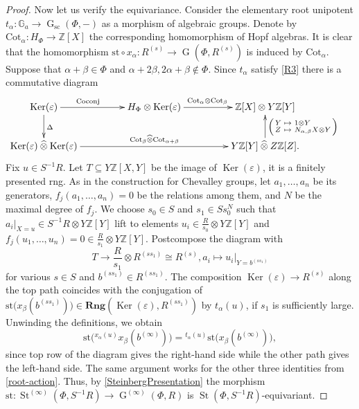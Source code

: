 \documentclass[oneside, 11pt]{amsart}
\numberwithin{equation}{section}
\theoremstyle{definition}
\theoremstyle{remark}
\DeclareMathOperator\St{St}
\DeclareMathOperator\Ker{Ker}
\DeclareMathOperator\GG{G}
\newcommand{\Rng}{\mathbf{Rng}}
\newcommand{\ZZ}{\mathbb{Z}}
\newcommand{\otimeshat}{\mathbin{\widehat{\otimes}}}
\newcommand{\up}[2]{{^{#1}\!{#2}}}
\begin{document}
\begin{proof}
 Now let us verify the equivariance. Consider the elementary root unipotent \(t_\alpha \colon \mathbb{G}_a \to \GG_{\mathrm{sc}}(\Phi, -)\) as a morphism of algebraic groups.
 Denote by \(\mathrm{Cot}_\alpha \colon H_\Phi \to \mathbb Z[X]\) the corresponding homomorphism of Hopf algebras. It is clear that the homomorphism \(\mathrm{st} \circ x_\alpha \colon R^{(s)} \to \GG(\Phi, R^{(s)})\) is induced by \(\mathrm{Cot}_\alpha\).
 Suppose that \(\alpha + \beta \in \Phi\) and \(\alpha + 2\beta, 2\alpha + \beta \notin \Phi\).
 Since $t_\alpha$ satisfy \eqref{R3} there is a commutative diagram
 \[\xymatrix@+1.8pc @R=2pc {
 \Ker(\varepsilon) \ar[r]^(.4){\mathrm{Coconj}} \ar[d]^{\Delta} &
 H_\Phi \otimes \Ker(\varepsilon) \ar[r]^(0.48){\mathrm{Cot}_\alpha \otimes \mathrm{Cot}_\beta} &
 \mathbb Z[X] \otimes Y \mathbb Z[Y]\\
 \Ker(\varepsilon) \otimeshat \Ker(\varepsilon) \ar[rr]^{\mathrm{Cot}_\beta \otimeshat \mathrm{Cot}_{\alpha + \beta}} &&
 Y \mathbb Z[Y] \otimeshat Z \mathbb Z[Z]. \ar[u]_{\begin{psmallmatrix*}[l] Y & \mapsto & 1 \otimes Y\\ Z & \mapsto & N_{\alpha,\beta} X \otimes Y \end{psmallmatrix*}} &
 }\]
 Fix \(u \in S^{-1} R\). Let \(T \subseteq Y \ZZ[X, Y]\) be the image of \(\Ker(\varepsilon)\), it is a finitely presented rng. As in the construction for Chevalley groups, let \(a_1, \ldots, a_n\) be its generators, \(f_j(a_1, \ldots, a_n) = 0\) be the relations among them, and \(N\) be the maximal degree of \(f_j\). We choose \(s_0 \in S\) and \(s_1 \in Ss_0^N\) such that \(a_i|_{X = u} \in S^{-1} R \otimes Y \ZZ[Y]\) lift to elements \(u_i \in \frac R{s_0} \otimes Y \ZZ[Y]\) and \(f_j(u_1, \ldots, u_n) = 0 \in \frac R{s_1} \otimes Y \ZZ[Y]\).
 Postcompose the diagram with
 \[\textstyle T \to \frac R{s_1} \otimes R^{(ss_1)} \cong R^{(s)}, a_i \mapsto u_i|_{Y = b^{(ss_1)}}\]
 for various \(s \in S\) and \(b^{(ss_1)} \in R^{(ss_1)}\). The composition \(\Ker(\varepsilon) \to R^{(s)}\) along the top path coincides with the conjugation of \(\mathrm{st}\bigl(x_\beta(b^{(ss_1)})\bigr) \in \Rng(\Ker(\varepsilon), R^{(ss_1)})\) by \(t_\alpha(u)\), if \(s_1\) is sufficiently large. Unwinding the definitions, we obtain
 \[\mathrm{st}\bigl(\up{x_\alpha(u)}{x_\beta(b^{(\infty)})}\bigr) = \up{t_\alpha(u)}{\mathrm{st}\bigl(x_\beta(b^{(\infty)})\bigr)},\]
 since top row of the diagram gives the right-hand side while the other path gives the left-hand side. The same argument works for the other three identities from \cref{root-action}. Thus, by \cref{SteinbergPresentation} the morphism \(\mathrm{st} \colon \St^{(\infty)}(\Phi, S^{-1} R) \to \GG^{(\infty)}(\Phi, R)\) is \(\St(\Phi, S^{-1} R)\)-equivariant.






\end{proof}
\end{document}
